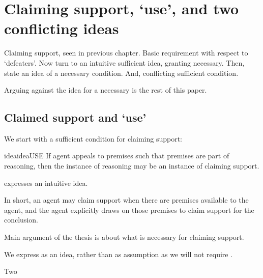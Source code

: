 \chapter{Claiming support, `use', and two conflicting ideas}
\label{cha:claiming-support-use}

\begin{note}
  Claiming support, seen in previous chapter.
  Basic requirement with respect to `defeaters'.
  Now turn to an intuitive sufficient idea, granting necessary.
  Then, state an idea of a necessary condition.
  And, conflicting sufficient condition.

  Arguing against the idea for a necessary is the rest of this paper.
\end{note}


\section{Claimed support and `use'}
\label{sec:claimed-support-use}

\begin{note}
  We start with a sufficient condition for claiming support:
  \begin{restatable}{idea}{ideaUSE}\label{prem:bP}\label{prop:USE}
    If agent appeals to premises such that premises are part of reasoning, then the instance of reasoning may be an instance of claiming support.
  \end{restatable}

  \USE{} expresses an intuitive idea.

  In short, an agent may claim support when there are premises available to the agent, and the agent explicitly draws on those premises to claim support for the conclusion.

  Main argument of the thesis is about what is necessary for claiming support.

  We express \USE{} as an idea, rather than as assumption as we will not require \USE{}.
\end{note}

\begin{note}
  Two 
\end{note}

